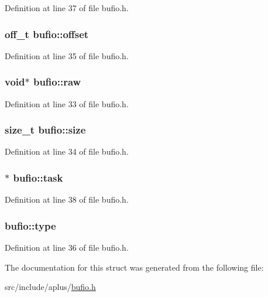 Definition at line 37 of file bufio.\+h.

\hypertarget{structbufio_a0f3f80e49eba1806c7468d2283083ea0}{
\subsubsection[{offset}]{\setlength{\rightskip}{0pt plus 5cm}off\+\_\+t bufio\+::offset}}\label{structbufio_a0f3f80e49eba1806c7468d2283083ea0}


Definition at line 35 of file bufio.\+h.

\hypertarget{structbufio_a7d5a293fbae342f7f9da0390aa04d74a}{
\subsubsection[{raw}]{\setlength{\rightskip}{0pt plus 5cm}void$\ast$ bufio\+::raw}}\label{structbufio_a7d5a293fbae342f7f9da0390aa04d74a}


Definition at line 33 of file bufio.\+h.

\hypertarget{structbufio_a233f5f8090a3f39d9471333db439e2bb}{
\subsubsection[{size}]{\setlength{\rightskip}{0pt plus 5cm}size\+\_\+t bufio\+::size}}\label{structbufio_a233f5f8090a3f39d9471333db439e2bb}


Definition at line 34 of file bufio.\+h.

\hypertarget{structbufio_a27683bf934579d5f42529dcea191db50}{
\subsubsection[{task}]{$\ast$ bufio\+::task}}\label{structbufio_a27683bf934579d5f42529dcea191db50}


Definition at line 38 of file bufio.\+h.

\hypertarget{structbufio_ad5542b6d1da521611e9d5790a4a9e651}{
\subsubsection[{type}]{ bufio\+::type}}\label{structbufio_ad5542b6d1da521611e9d5790a4a9e651}


Definition at line 36 of file bufio.\+h.



The documentation for this struct was generated from the following file\+:\begin{DoxyCompactItemize}
\item 
src/include/aplus/\hyperlink{bufio_8h}{bufio.\+h}\end{DoxyCompactItemize}
